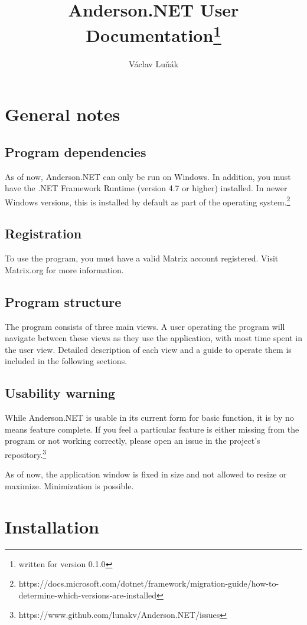 \documentclass[titlepage]{scrartcl}
\title{Anderson.NET User Documentation\thanks{written for version 0.1.0}}
\author{Václav Luňák}
\begin{document}
\maketitle
\tableofcontents
\pagebreak
\section{General notes}
\subsection{Program dependencies}
As of now, Anderson.NET can only be run on Windows. In addition, you must have the .NET Framework Runtime (version 4.7 or higher) installed. In newer Windows versions, this is installed by default as part of the operating system.\footnote{https://docs.microsoft.com/dotnet/framework/migration-guide/how-to-determine-which-versions-are-installed}

\subsection{Registration}
To use the program, you must have a valid Matrix account registered. Visit Matrix.org for more information.
\subsection{Program structure}
The program consists of three main views. A user operating the program will navigate between these views as they use the application, with most time spent in the user view. Detailed description of each view and a guide to operate them is included in the following sections. 

\subsection{Usability warning}
While Anderson.NET is usable in its current form for basic function, it is by no means feature complete. If you feel a particular feature is either missing from the program or not working correctly, please open an issue in the project's repository.\footnote{https://www.github.com/lunakv/Anderson.NET/issues}

As of now, the application window is fixed in size and not allowed to resize or maximize. Minimization is possible.

\section{Installation}
\end{document}
